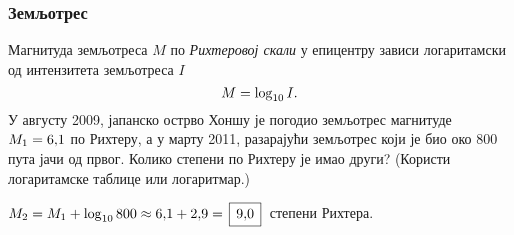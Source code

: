 \subsubsection{Земљотрес}

\zadatak Магнитуда земљотреса $M$ по {\sl Рихтеровој скали\/} у епицентру зависи логаритамски од 
интензитета земљотреса $I$
$$
M=\log_{10} I.
$$
У августу 2009, јапанско острво Хоншу
је погодио земљотрес магнитуде $M_1=6\.1$ по Рихтеру, а у марту 2011,
разарајући земљотрес који је био око 800 пута јачи од првог.
Колико степени по Рихтеру је имао други?
(Користи логаритамске таблице или логаритмар.)

\resenje $M_2 = M_1 + \logten 800 \approx 6\.1 + 2\.9 = \ram{9\.0}$ степени Рихтера. 
